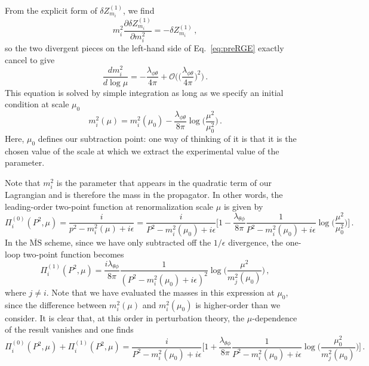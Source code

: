\documentclass{article}
\numberwithin{equation}{subsection}
\begin{document}
From the explicit form of $\delta Z_{m_i}^{(1)}$, we find
\begin{equation}
	m_i^2\frac{\partial \delta Z_{m_i}^{(1)}}{\partial m_i^2} = -\delta Z_{m_i}^{(1)}\,,
\end{equation}
so the two divergent pieces on the left-hand side of Eq.~\eqref{eq:preRGE} exactly cancel to give
\begin{equation}
	\frac{dm_i^2}{d\log\mu} = - \frac{\lambda_{\phi\theta}}{4\pi} + \mathcal{O}\Bigg(\Big(\frac{\lambda_{\phi\theta}}{4\pi}\Big)^2\Bigg)\,.
\end{equation}
This equation is solved by simple integration as long as we specify an initial condition at scale $\mu_0$
\begin{equation}
	m_i^2(\mu) = m_i^2(\mu_0) - \frac{\lambda_{\phi\theta}}{8\pi}\log\Big(\frac{\mu^2}{\mu_0^2}\Big)\,.
\end{equation}
Here, $\mu_0$ defines our subtraction point: one way of thinking of it is that it is the chosen value of the scale at which we extract the experimental value of the parameter.

Note that $m_i^2$ is the parameter that appears in the quadratic term of our Lagrangian and is therefore the mass in the
propagator. In other words, the leading-order two-point function at renormalization scale $\mu$ is given by
\begin{equation}
	\Pi_i^{(0)}(P^2,\mu) = \frac{i}{p^2 - m_i^2(\mu) + i\epsilon} = \frac{i}{P^2 - m_i^2(\mu_0) + i\epsilon}\Bigg[1
	- \frac{\lambda_{\theta\phi}}{8\pi}\frac{1}{P^2 - m_i^2(\mu_0) +
	i\epsilon}\log\Big(\frac{\mu^2}{\mu_0^2}\Big)\Bigg]\,.
\end{equation}
In the $\overline{\text{MS}}$ scheme, since we have only subtracted off the $1/\epsilon$ divergence, the one-loop
two-point function becomes
\begin{equation}
	\Pi_i^{(1)}(P^2,\mu) = \frac{i\lambda_{\theta\phi}}{8\pi}\frac{1}{(P^2 - m_i^2(\mu_0) + i\epsilon)^2}
	\log\Big(\frac{\mu^2}{m_j^2(\mu_0)}\Big)\,,
\end{equation}
where $j\neq i$. Note that we have evaluated the masses in this expression at $\mu_0$, since the difference between
$m_i^2(\mu)$ and $m_i^2(\mu_0)$ is higher-order than we consider. It is clear that, at this order in perturbation
theory, the $\mu$-dependence of the result vanishes and one finds
\begin{equation}\label{eq:twoPointMSbar}
	\Pi_i^{(0)}(P^2,\mu) + \Pi_i^{(1)}(P^2,\mu) = \frac{i}{P^2 - m_i^2(\mu_0) + i\epsilon}\Bigg[1 +
	\frac{\lambda_{\theta\phi}}{8\pi}\frac{1}{P^2 - m_i^2(\mu_0) + i\epsilon}
	\log\Big(\frac{\mu_0^2}{m_j^2(\mu_0)}\Big)\Bigg]\,.
\end{equation}
\end{document}
